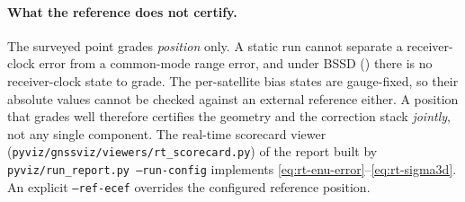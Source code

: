 \documentclass[main.tex]{subfiles}
\begin{document}
\paragraph{What the reference does not certify.}
The surveyed point grades \emph{position} only.  A static run cannot
separate a receiver-clock error from a common-mode range error, and
under BSSD () there is no receiver-clock state to
grade.  The per-satellite bias states are gauge-fixed, so their absolute
values cannot be checked against an external reference either.  A
position that grades well therefore certifies the geometry and the
correction stack \emph{jointly}, not any single component.  The
real-time scorecard viewer (\texttt{pyviz/gnssviz/viewers/rt\_scorecard.py})
of the report built by \texttt{pyviz/run\_report.py --run-config}
implements \eqref{eq:rt-enu-error}--\eqref{eq:rt-sigma3d}.  An explicit
\texttt{--ref-ecef} overrides the configured reference position.

\ifSubfilesClassLoaded{\printbibliography}{}
\end{document}
